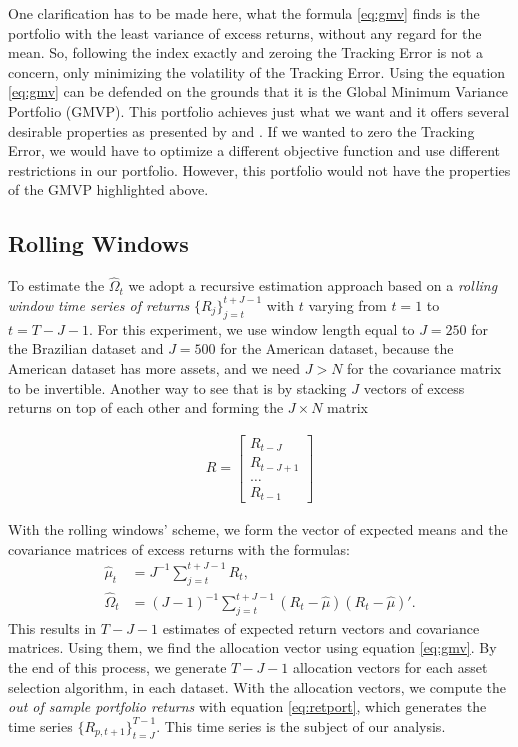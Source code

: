 \documentclass[12pt,oneside,a4paper]{memoir}
\begin{document}
One clarification has to be made here, what the formula \eqref{eq:gmv} finds is the portfolio with the least variance of excess returns, without any regard for the mean.
So, following the index exactly and zeroing the Tracking Error is not a concern, only minimizing the volatility of the Tracking Error.
Using the equation \eqref{eq:gmv} can be defended on the grounds that it is the Global Minimum Variance Portfolio (GMVP).
This portfolio achieves just what we want and it offers several desirable properties as presented by  and .
If we wanted to zero the Tracking Error, we would have to optimize a different objective function and use different restrictions in our portfolio.
However, this portfolio would not have the properties of the GMVP highlighted above.

\subsection*{Rolling Windows}

To estimate the $\hat{\Omega}_{t}$ we adopt a recursive estimation approach based on a \textit{rolling window time series of returns} $\{R_{j}\}_{j=t}^{t+J-1}$ with $t$ varying from $t=1$ to $t=T-J-1$.
For this experiment, we use window length equal to $J=250$ for the Brazilian dataset and $J=500$ for the American dataset, because the American dataset has more assets, and we need $J>N$ for the covariance matrix to be invertible.
Another way to see that is by stacking $J$ vectors of excess returns on top of each other and forming the $J \times N$ matrix 

\begin{align*}
R =
\begin{bmatrix}
	R_{t-J}	\\ R_{t-J+1} \\ \dots \\ R_{t-1}
\end{bmatrix}
\end{align*}

With the rolling windows' scheme, we form the vector of expected means and the covariance matrices of excess returns with the formulas:
\begin{align}
	\hat{\mu}_{t} &= J^{-1}\sum_{j=t}^{t+J-1} R_{t},
	\\
	\hat{\Omega}_{t} &= (J-1)^{-1} \sum_{j=t}^{t+J-1}(R_{t} - \hat{\mu})(R_{t} - \hat{\mu})'.
\end{align}
This results in $T-J-1$ estimates of expected return vectors and covariance matrices.
Using them, we find the allocation vector using equation \eqref{eq:gmv}.
By the end of this process, we generate $T-J-1$ allocation vectors for each asset selection algorithm, in each dataset.
With the allocation vectors, we compute the \textit{out of sample portfolio returns} with equation \eqref{eq:retport}, which generates the time series $\{R_{p,t+1}\}_{t=J}^{T-1}$.
This time series is the subject of our analysis. 
\end{document}
